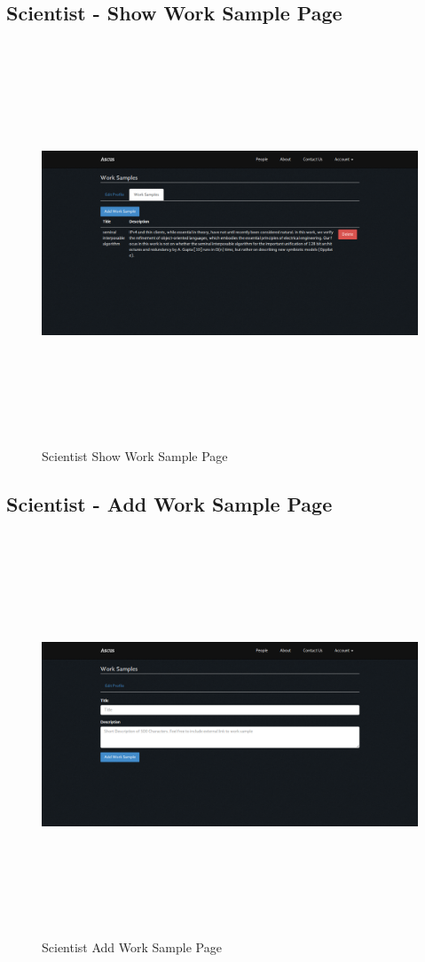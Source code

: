 \documentclass[a4paper,oneside,11pt]{report}
\begin{document}
\begin{appendices}
\pagebreak
\subsection{Scientist - Show Work Sample Page}
\begin{figure}[!ht]
\centering
\includegraphics[width=\textwidth,height=12cm,keepaspectratio]{appendix/third-iteration-full-scientist-show-work-sample-page.png}
\caption{Scientist Show Work Sample Page}
\end{figure}


\subsection{Scientist - Add Work Sample Page}
\begin{figure}[!ht]
\centering
\includegraphics[width=\textwidth,height=12cm,keepaspectratio]{appendix/third-iteration-scientist-add-work-sample-page.png}
\caption{Scientist Add Work Sample Page}
\end{figure}
\pagebreak


\end{appendices}
\end{document}
